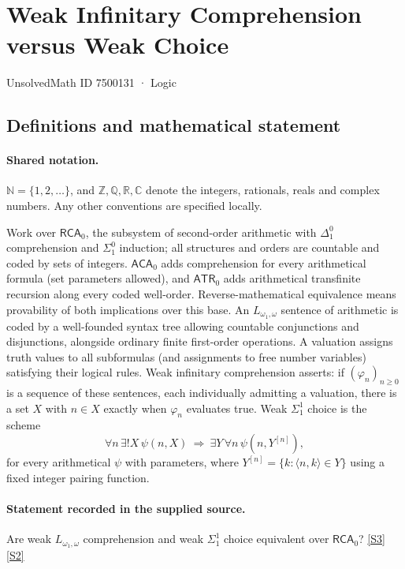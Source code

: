 \documentclass[11pt]{article}
\newcommand{\sref}[2]{\hyperlink{source:#1:#2}{[S#2]}}
\begin{document}
\setcounter{section}{7500130}
\section{Weak Infinitary Comprehension versus Weak Choice}\label{7500131}
{\small\sffamily UnsolvedMath ID 7500131 · Logic}
\subsection{Definitions and mathematical statement}

\paragraph{Shared notation.}$\mathbb N=\{1,2,\ldots\}$, and $\mathbb Z,\mathbb Q,\mathbb R,\mathbb C$ denote the integers, rationals, reals and complex numbers. Any other conventions are specified locally.


Work over $\mathsf{RCA}_0$, the subsystem of second-order arithmetic with $\Delta^0_1$ comprehension and $\Sigma^0_1$ induction; all structures and orders are countable and coded by sets of integers. $\mathsf{ACA}_0$ adds comprehension for every arithmetical formula (set parameters allowed), and $\mathsf{ATR}_0$ adds arithmetical transfinite recursion along every coded well-order. Reverse-mathematical equivalence means provability of both implications over this base. An $L_{\omega_1,\omega}$ sentence of arithmetic is coded by a well-founded syntax tree allowing countable conjunctions and disjunctions, alongside ordinary finite first-order operations. A valuation assigns truth values to all subformulas (and assignments to free number variables) satisfying their logical rules. Weak infinitary comprehension asserts: if $(\varphi_n)_{n\ge0}$ is a sequence of these sentences, each individually admitting a valuation, there is a set $X$ with $n\in X$ exactly when $\varphi_n$ evaluates true. Weak $\Sigma^1_1$ choice is the scheme \[\forall n\,\exists!X\,\psi(n,X)\ \Longrightarrow\ \exists Y\,\forall n\,\psi(n,Y^{[n]}),\] for every arithmetical $\psi$ with parameters, where $Y^{[n]}=\{k:\langle n,k\rangle\in Y\}$ using a fixed integer pairing function.
\paragraph{Statement recorded in the supplied source.}
Are weak $L_{\omega_1,\omega}$ comprehension and weak $\Sigma^1_1$ choice equivalent over $\mathsf{RCA}_0$? \sref{7500131}{3} \sref{7500131}{2}
\end{document}
